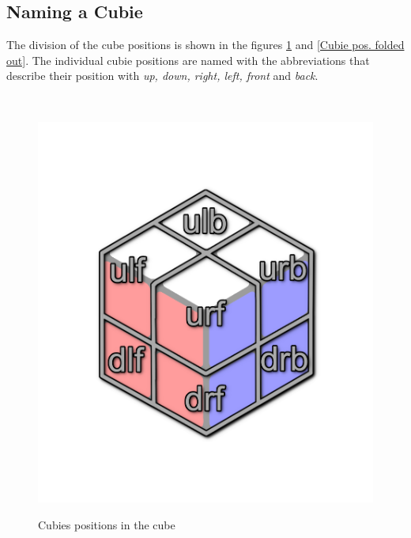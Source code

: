 \documentclass[12pt,a4paper]{article}
\theoremstyle{custom}
\begin{document}
\subsection{Naming a Cubie}
\label{Name}




The division of the cube positions is shown in the figures \ref{Image_cubiePositionName} and \ref{Cubie pos. folded out}. The individual cubie positions are named with the abbreviations that describe their position with \textit{up, down, right, left, front} and \textit{back}.

\begin{minipage}[b][][b]{0.04\textwidth}$\ $
\end{minipage}\begin{minipage}[b][][b]{0.43\textwidth}

\begin{figure}[H]
\centering
\includegraphics[scale=0.15]{caged_positions.png} \\
\caption[Names of the cubies  positions in the cube]{Cubies positions in the cube}
\label{Image_cubiePositionName}
\end{figure}


\end{minipage}
\end{document}
